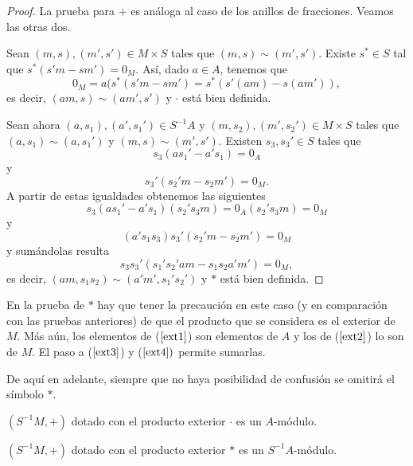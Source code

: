 \documentclass[../main.tex]{subfiles}
\begin{document}
	\begin{proof}
		La prueba para $+$ es análoga al caso de los anillos de fracciones. Veamos las otras dos.

		Sean $(m,s),(m',s')\in M\times S$ tales que $(m,s)\sim(m',s')$. Existe $s^*\in S$ tal que $s^*(s'm-sm')=0_M$. Así, dado $a\in A$, tenemos que
		$$0_M=a(s^*(s'm-sm')=s^*(s'(am)-s(am')),$$
		es decir, $(am,s)\sim (am',s')$ y $·$ está bien definida.

		Sean ahora $(a,s_1),(a',s_1')\in S^{-1}A$ y $(m,s_2),(m',s_2')\in M\times S$ tales que $(a,s_1)\sim(a,s_1')$ y $(m,s)\sim(m',s')$. Existen $s_3,s_3'\in S$ tales que
		\begin{equation}\label{ext1}
		s_3(as_1'-a's_1)=0_A
		\end{equation} y \begin{equation}\label{ext2}
		s_3'(s_2'm-s_2m')=0_M.
		\end{equation}
		A partir de estas igualdades obtenemos las siguientes
		\begin{equation}\label{ext3}
		s_3(as_1'-a's_1)(s_2's_3m)=0_A(s_2's_3m)=0_M
		\end{equation} y \begin{equation}\label{ext4}
		(a's_1s_3)s_3'(s_2'm-s_2m')=0_M
		\end{equation}
		y sumándolas resulta
		$$s_3s_3'(s_1's_2'am-s_1s_2a'm')=0_M,$$
		es decir, $(am,s_1s_2)\sim(a'm',s_1's_2')$ y $*$ está bien definida.
	\end{proof}

	\begin{remark}
		En la prueba de $*$ hay que tener la precaución en este caso (y en comparación con las pruebas anteriores) de que el producto que se considera es el exterior de $M$. Más aún, los elementos de ($\ref{ext1}$) son elementos de $A$ y los de ($\ref{ext2}$) lo son de $M$. El paso a ($\ref{ext3}$) y ($\ref{ext4})$ permite sumarlas.
	\end{remark}

	De aquí en adelante, siempre que no haya posibilidad de confusión se omitirá el símbolo $\ast$.

	\begin{corollary}
		$(S^{-1}M,+)$ dotado con el producto exterior $·$ es un $A$-módulo.
	\end{corollary}

	\begin{corollary}
		$(S^{-1}M,+)$ dotado con el producto exterior $*$ es un $S^{-1}A$-módulo.
	\end{corollary}
\end{document}

